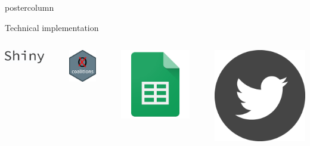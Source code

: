 \documentclass[final,hyperref={pdfpagelabels=false}]{beamer}
\newcommand*\circled[1]{\tikz[baseline=(char.base)]{
\node[shape=circle,draw,inner sep=2pt] (char) {#1};}}
\begin{document}
\begin{frame}
\begin{columns}
\begin{column}{1\textwidth}
\begin{columns}[T]
\begin{column}{.484\textwidth}
\begin{beamercolorbox}[center,wd=\textwidth]{postercolumn}
\begin{minipage}[T]{.95\textwidth}
\begin{block}{\footnotesize \circled{3} Technical implementation}
\begin{columns}[t]
  \begin{column}{.15\textwidth}
  \begin{center}
  \vspace{1ex}
  \includegraphics[height=3ex]{figures/implementation_shiny}
  \end{center}
  \end{column}

  \hspace{-1.5ex}
  \textcolor{LMUlightgray}{\vrule{}}
  \hspace{1.5ex}

  \begin{column}{.15\textwidth}
  \begin{center}
  \includegraphics[height=5ex]{figures/implementation_coalitions}
  \end{center}
  \end{column}

  \hspace{-1.5ex}
  \textcolor{LMUlightgray}{\vrule{}}
  \hspace{1.5ex}

  \begin{column}{.15\textwidth}
  \begin{center}
  \includegraphics[height=5ex]{figures/implementation_sheets}
  \end{center}
  \end{column}

  \hspace{-1.5ex}
  \textcolor{LMUlightgray}{\vrule{}}
  \hspace{1.5ex}

  \begin{column}{.15\textwidth}
  \begin{center}
  \includegraphics[height=5ex]{figures/implementation_twitter}
  \end{center}
  \end{column}
\end{columns}
\end{block}


\end{minipage}
\end{beamercolorbox}
\end{column}
\end{columns}
\end{column}
\end{columns}
\end{frame}
\end{document}
